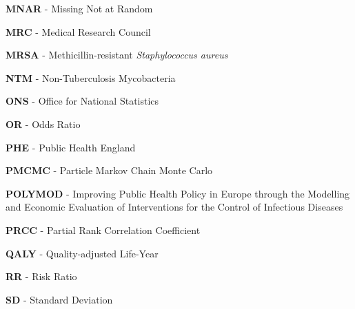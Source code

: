 \documentclass[11pt,twoside]{bristolthesis}
\begin{document}
\begin{acronyms}
      \par
      
      \textbf{MNAR} - Missing Not at Random
      
      \par
      
      \textbf{MRC} - Medical Research Council
      
      \par
      
      \textbf{MRSA} - Methicillin-resistant \emph{Staphylococcus aureus}
      
      \par
      
      \textbf{NTM} - Non-Tuberculosis Mycobacteria
      
      \par
      
      \textbf{ONS} - Office for National Statistics
      
      \par
      
      \textbf{OR} - Odds Ratio
      
      \par
      
      \textbf{PHE} - Public Health England
      
      \par
      
      \textbf{PMCMC} - Particle Markov Chain Monte Carlo
      
      \par
      
      \textbf{POLYMOD} - Improving Public Health Policy in Europe through the Modelling and Economic Evaluation of Interventions for the Control of Infectious Diseases
      
      \par
      
      \textbf{PRCC} - Partial Rank Correlation Coefficient
      
      \par
      
      \textbf{QALY} - Quality-adjusted Life-Year
      
      \par
      
      \textbf{RR} - Risk Ratio
      
      \par
      
      \textbf{SD} - Standard Deviation
      

\end{acronyms}
\end{document}
